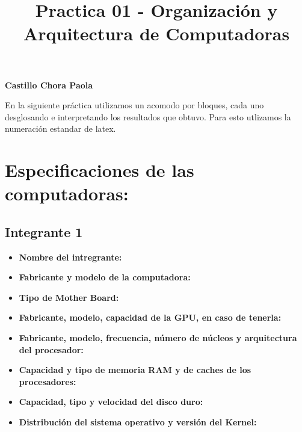 \documentclass[12pt]{article}
\newcommand{\pl}[1]{\item \textbf{ #1 }}
\begin{document}

%
\title{Practica 01 - Organización y Arquitectura de Computadoras}
\begin{center}
    \textbf{Castillo Chora Paola}
    
\end{center}
En la siguiente práctica utilizamos un acomodo por bloques, cada uno desglosando e interpretando los resultados que obtuvo. Para esto utlizamos la numeración estandar de latex.
\section{Especificaciones de las computadoras:}
\subsection{Integrante 1}
\begin{itemize}
    \pl{Nombre del intregrante:}

    \pl{Fabricante y modelo de la computadora:}

    \pl{Tipo de Mother Board:}

    \pl{Fabricante, modelo, capacidad de la GPU, en caso de tenerla:}

    \pl{Fabricante, modelo, frecuencia, número de núcleos y arquitectura del procesador:}

    \pl{Capacidad y tipo de memoria RAM y de caches de los procesadores:}

    \pl{Capacidad, tipo y velocidad del disco duro:}

    \pl{Distribución del sistema operativo y versión del Kernel:}
\end{itemize}
\end{document}
